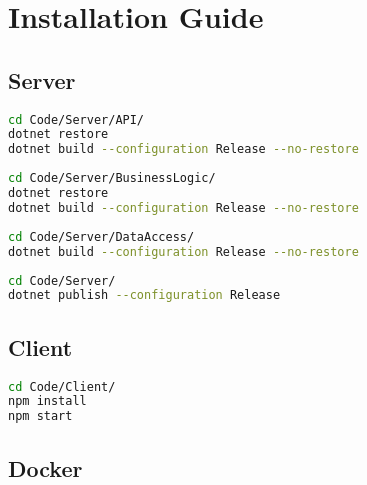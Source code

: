 \chapter{Installation Guide} \label{ch:installation_guide}

\section{Server}


\begin{lstlisting}[language=bash, caption={Install dependencies and build \textit{API}.}, label=lst:api_deps_and_build]
cd Code/Server/API/
dotnet restore
dotnet build --configuration Release --no-restore
\end{lstlisting}

\begin{lstlisting}[language=bash, caption={Install dependencies and build \textit{BusinessLogic}.}, label=lst:business_logic_deps_and_build]
cd Code/Server/BusinessLogic/
dotnet restore
dotnet build --configuration Release --no-restore
\end{lstlisting}

\begin{lstlisting}[language=bash, caption={Install dependencies and build \textit{DataAccess}.}, label=lst:data_access_deps_and_build]
cd Code/Server/DataAccess/
dotnet build --configuration Release --no-restore
\end{lstlisting}

\begin{lstlisting}[language=bash, caption={Publish \textit{Server}.}, label=lst:publish_server]
cd Code/Server/
dotnet publish --configuration Release
\end{lstlisting}
        

\section{Client}


\begin{lstlisting}[language=bash, caption={Install dependencies and build \textit{Client}.}, label=lst:client_deps_and_build]
cd Code/Client/
npm install
npm start
\end{lstlisting}

\section{Docker}

